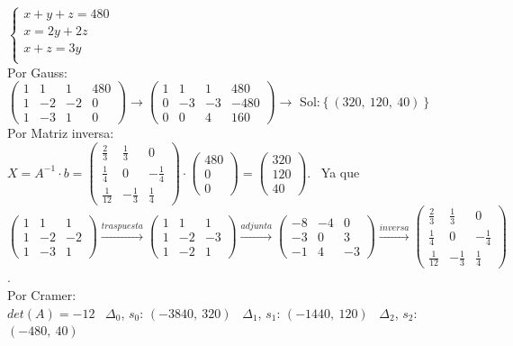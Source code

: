 \documentclass[addpoints,spanish, 12pt,a4paper]{exam}
\begin{document}
\begin{questions}
\begin{parts}
\begin{solution}
$\left\{\begin{matrix}x + y + z = 480\\x = 2 y + 2 z\\x + z = 3 y\\\end{matrix}\right.$ \\  Por Gauss: \\ $\left(\begin{matrix}1 & 1 & 1 & 480\\1 & -2 & -2 & 0\\1 & -3 & 1 & 0\end{matrix}\right)\rightarrow\left(\begin{matrix}1 & 1 & 1 & 480\\0 & -3 & -3 & -480\\0 & 0 & 4 & 160\end{matrix}\right)\to$ Sol:$\left\{\left( 320, \  120, \  40\right)\right\}$ \\ Por Matriz inversa: \\ $X=A^{-1}\cdot b=\left(\begin{matrix}\frac{2}{3} & \frac{1}{3} & 0\\\frac{1}{4} & 0 & - \frac{1}{4}\\\frac{1}{12} & - \frac{1}{3} & \frac{1}{4}\end{matrix}\right)\cdot\left(\begin{matrix}480\\0\\0\end{matrix}\right)=\left(\begin{matrix}320\\120\\40\end{matrix}\right)$. \ Ya que $\left(\begin{matrix}1 & 1 & 1\\1 & -2 & -2\\1 & -3 & 1\end{matrix}\right)\xrightarrow{traspuesta}\left(\begin{matrix}1 & 1 & 1\\1 & -2 & -3\\1 & -2 & 1\end{matrix}\right)\xrightarrow{adjunta}\left(\begin{matrix}-8 & -4 & 0\\-3 & 0 & 3\\-1 & 4 & -3\end{matrix}\right)\xrightarrow{inversa}\left(\begin{matrix}\frac{2}{3} & \frac{1}{3} & 0\\\frac{1}{4} & 0 & - \frac{1}{4}\\\frac{1}{12} & - \frac{1}{3} & \frac{1}{4}\end{matrix}\right)$. \\ Por Cramer: \\ $det(A)=-12$ \ $\Delta_0$, $s_0$: $\left( -3840, \  320\right)$ \ $\Delta_1$, $s_1$: $\left( -1440, \  120\right)$ \ $\Delta_2$, $s_2$: $\left( -480, \  40\right)$ \ \end{solution}


\end{parts}
\end{questions}
\end{document}
